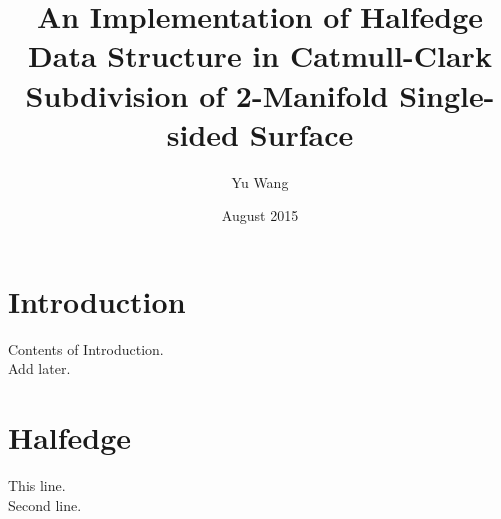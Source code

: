 \documentclass[12pt]{article}
\title{An Implementation of Halfedge Data Structure in Catmull-Clark Subdivision of 2-Manifold Single-sided Surface}
\author{Yu Wang}
\date{August 2015}
\begin{document}
\maketitle
\newpage


\section{Introduction}
Contents of Introduction.\\
 Add later.\\

\section{Halfedge}

This line.\\
Second line.
\end{document}
